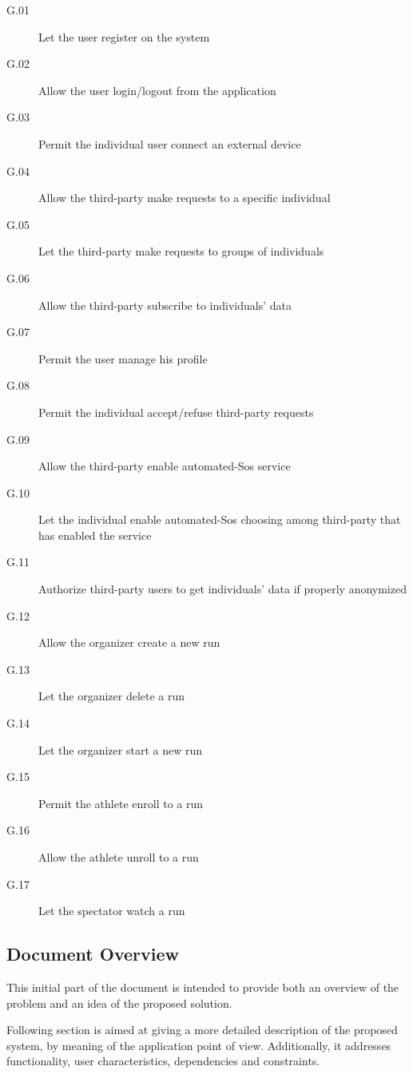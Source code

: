 \documentclass[a4paper]{article}
\begin{document}
        \begin{description}
            \item[G.01] Let the user register on the system
            \item[G.02] Allow the user login/logout from the application
            \item[G.03] Permit the individual user connect an external device
            \item[G.04] Allow the third-party make requests to a specific individual
            \item[G.05] Let the third-party make requests to groups of individuals
            \item[G.06] Allow the third-party subscribe to individuals' data
            \item[G.07] Permit the user manage his profile
            \item[G.08] Permit the individual accept/refuse third-party requests
            \item[G.09] Allow the third-party enable automated-Sos service
            \item[G.10] Let the individual enable automated-Sos choosing among third-party that has enabled the service
            \item[G.11] Authorize third-party users to get individuals' data if properly anonymized
            \item[G.12] Allow the organizer create a new run
            \item[G.13] Let the organizer delete a run
            \item[G.14] Let the organizer start a new run
            \item[G.15] Permit the athlete enroll to a run
            \item[G.16] Allow the athlete unroll to a run
            \item[G.17] Let the spectator watch a run
        \end{description}
    
    \subsection{Document Overview}
        This initial part of the document is intended to provide both an overview of the problem and an idea of the proposed solution.
        
        Following section is aimed at giving a more detailed description of the proposed system, by meaning of the application point of view. Additionally, it addresses functionality, user characteristics, dependencies and constraints.
        
\end{document}
